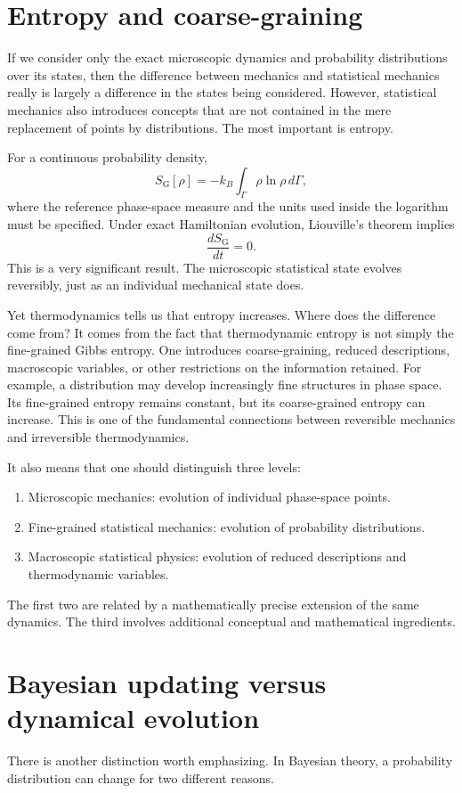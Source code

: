\section{Entropy and coarse-graining}
If we consider only the exact microscopic dynamics and probability
distributions over its states, then the difference between mechanics and
statistical mechanics really is largely a difference in the states being
considered.
However, statistical mechanics also introduces concepts that are not contained
in the mere replacement of points by distributions.
The most important is entropy.

For a continuous probability density,
\[S_{\mathrm G}[\rho]=-k_B\int_\Gamma \rho\ln\rho\,d\Gamma,\]
where the reference phase-space measure and the units used inside the logarithm
must be specified.
Under exact Hamiltonian evolution, Liouville's theorem implies
\[\boxed{\frac{dS_{\mathrm G}}{dt}=0.}\]
This is a very significant result.
The microscopic statistical state evolves reversibly, just as an individual
mechanical state does.

Yet thermodynamics tells us that entropy increases.
Where does the difference come from?
It comes from the fact that thermodynamic entropy is not simply the
fine-grained Gibbs entropy.
One introduces coarse-graining, reduced descriptions, macroscopic variables, or
other restrictions on the information retained.
For example, a distribution may develop increasingly fine structures in phase
space. Its fine-grained entropy remains constant, but its coarse-grained
entropy can increase.
This is one of the fundamental connections between reversible mechanics and
irreversible thermodynamics.

It also means that one should distinguish three levels:
\begin{enumerate}
   \item Microscopic mechanics: evolution of individual phase-space points.
   \item Fine-grained statistical mechanics: evolution of probability distributions.
   \item  Macroscopic statistical physics: evolution of reduced descriptions and thermodynamic variables.
\end{enumerate}
The first two are related by a mathematically precise extension of the same
dynamics. The third involves additional conceptual and mathematical
ingredients.

\section{Bayesian updating versus dynamical evolution}
There is another distinction worth emphasizing.
In Bayesian theory, a probability distribution can change for two different reasons.

